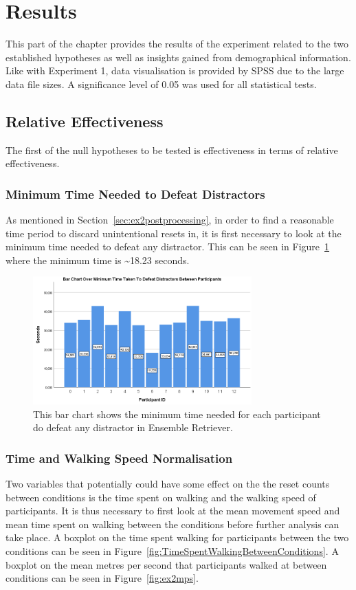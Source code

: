 \section{Results}
This part of the chapter provides the results of the experiment related to the two established hypotheses as well as insights gained from demographical information. Like with Experiment 1, data visualisation is provided by SPSS due to the large data file sizes. A significance level of 0.05 was used for all statistical tests. 

\subsection{Relative Effectiveness}
The first of the null hypotheses to be tested is effectiveness in terms of relative effectiveness. 

\subsubsection{Minimum Time Needed to Defeat Distractors}
As mentioned in Section~\ref{sec:ex2postprocessing}, in order to find a reasonable time period to discard unintentional resets in, it is first necessary to look at the minimum time needed to defeat any distractor. This can be seen in Figure~\ref{fig:minDistractorDefeatTime} where the minimum time is \textasciitilde18.23 seconds.

\begin{figure}[tbph]
    \centering
    \includegraphics[width=0.75\textwidth]{figures/graphs/MinDistractorDefeatTime.png}
    \caption[Minimum Time Needed To Defeat Distractors Between Participants]{This bar chart shows the minimum time needed for each participant do defeat any distractor in Ensemble Retriever.}
    \label{fig:minDistractorDefeatTime}
\end{figure}

\subsubsection{Time and Walking Speed Normalisation}
Two variables that potentially could have some effect on the the reset counts between conditions is the time spent on walking and the walking speed of participants. It is thus necessary to first look at the mean movement speed and mean time spent on walking between the conditions before further analysis can take place. A boxplot on the time spent walking for participants between the two conditions can be seen in Figure~\ref{fig:TimeSpentWalkingBetweenConditions}. A boxplot on the mean metres per second that participants walked at between conditions can be seen in Figure~\ref{fig:ex2mps}.

